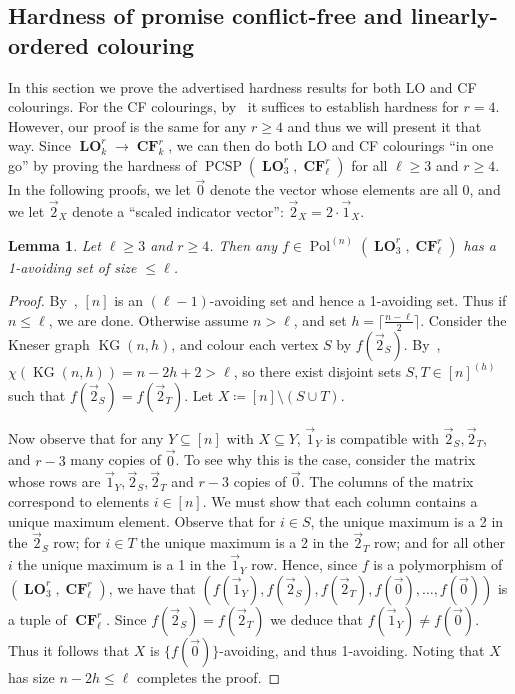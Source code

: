 \documentclass[a4paper,11pt]{article}
\newcommand{\2}{\vec{2}}
\newcommand{\1}{\vec{1}}
\newcommand{\0}{\vec{0}}
\DeclareMathOperator{\KG}{KG}
\DeclareMathOperator{\PCSP}{PCSP}
\DeclareMathOperator{\Pol}{Pol}
\DeclareMathOperator{\CF}{\mathbf{CF}}
\DeclareMathOperator{\LO}{\mathbf{LO}}
\theoremstyle{plain}
\newtheorem{lemma}[theorem]{Lemma}
\theoremstyle{definition}
\begin{document}
\subsection{Hardness of promise conflict-free and linearly-ordered colouring}
\label{sec:proof}

In this section we prove the advertised hardness results for both LO and CF
colourings. For the CF colourings, by~ it suffices to establish
hardness for $r=4$. However, our proof is the same for any $r\geq 4$ and thus we
will present it that way. Since $\LO^r_k\to\CF^r_k$, we can then do both LO and
CF colourings ``in one go'' by proving the hardness of $\PCSP(\LO_3^r, \CF_\ell^r)$ for all $\ell \geq 3$ and $r \geq 4$. 
In the following proofs, we let $\0$ denote the vector whose elements are all 0, and we let $\2_X$ denote a ``scaled indicator vector'': $\2_X = 2 \cdot \1_X$.

\begin{lemma}\label{lem:existence}
    Let $\ell \geq 3$ and $r\geq 4$.
    Then any $f \in \Pol^{(n)}(\LO_3^r, \CF_\ell^r)$ has a 1-avoiding set of size $\leq \ell$.
\end{lemma}
\begin{proof}
  By~, $[n]$ is an $(\ell-1)$-avoiding set and hence a 1-avoiding set. Thus if $n\leq\ell$, we are done.
  Otherwise assume $n > \ell$, and set $h = \lceil \frac{n-\ell}{2}\rceil$.
    Consider the Kneser graph $\KG(n,h)$, and colour each vertex $S$ by $f(\2_S)$. By~, $\chi(\KG(n, h)) = n - 2h + 2 > \ell$, so there exist disjoint sets $S, T \in [n]^{(h)}$  such that $f(\2_S) = f(\2_T)$. Let $X \coloneqq [n]\setminus (S \cup T)$.
    
    Now observe that for any $Y \subseteq [n]$ with $X\subseteq Y$, $\1_Y$ is
    compatible with $\2_S, \2_T$, and $r-3$ many copies of $\0$. To see why this
    is the case, consider the matrix whose rows are $\1_Y, \2_S, \2_T$ and $r -
    3$ copies of $\0$. The columns of the matrix correspond to elements $i \in
    [n]$. We must show that each column contains a unique maximum element.
    Observe that for $i \in S$, the unique maximum is a 2 in the $\2_S$ row; for
    $i \in T$ the unique maximum is a 2 in the $\2_T$ row; and for all other $i$
    the unique maximum is a 1 in the $\1_Y$ row. Hence, since $f$ is a
    polymorphism of $(\LO_3^r,\CF_\ell^r)$, we have that $(f(\1_Y), f(\2_S),
    f(\2_T), f(\0), \ldots, f(\0))$ is a tuple of $\CF_\ell^r$. Since $f(\2_S) = f(\2_T)$ we deduce that $f(\1_Y) \neq f(\0)$.
Thus it follows that $X$ is $\{ f(\0) \}$-avoiding, and thus 1-avoiding. Noting that $X$ has size $n-2h\leq \ell$ completes the proof.
\end{proof}
\end{document}

